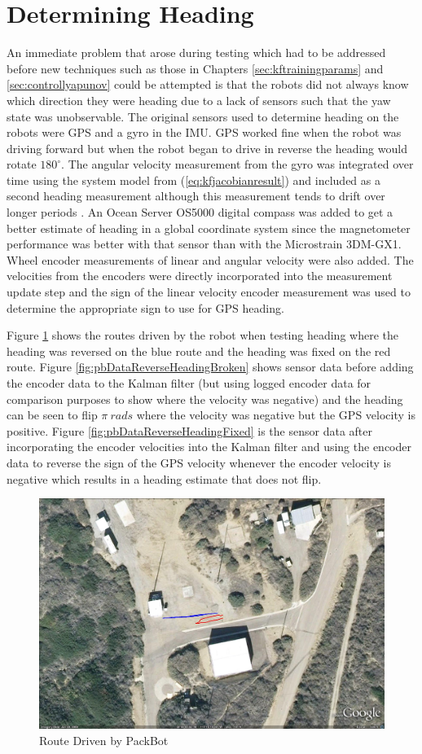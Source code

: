 \section{Determining Heading}
\label{sec:determineHeading}
An immediate problem that arose during testing which had to be addressed before new techniques such as those in Chapters \ref{sec:kftrainingparams} and \ref{sec:controllyapunov} could be attempted is that the robots did not always know which direction they were heading due to a lack of sensors such that the yaw state was unobservable. The original sensors used to determine heading on the robots were GPS and a gyro in the IMU. GPS worked fine when the robot was driving forward but when the robot began to drive in reverse the heading would rotate $180^\circ$. The angular velocity measurement from the gyro was integrated over time using the system model from (\ref{eq:kfjacobianresult}) and included as a second heading measurement although this measurement tends to drift over longer periods \cite{ChungOjeda01}. An Ocean Server OS5000 digital compass was added to get a better estimate of heading in a global coordinate system since the magnetometer performance was better with that sensor than with the Microstrain 3DM-GX1. Wheel encoder measurements of linear and angular velocity were also added. The velocities from the encoders were directly incorporated into the measurement update step and the sign of the linear velocity encoder measurement was used to determine the appropriate sign to use for GPS heading.

Figure \ref{fig:GEHeadingReverse} shows the routes driven by the robot when testing heading where the heading was reversed on the blue route and the heading was fixed on the red route. Figure \ref{fig:pbDataReverseHeadingBroken} shows sensor data before adding the encoder data to the Kalman filter (but using logged encoder data for comparison purposes to show where the velocity was negative) and the heading can be seen to flip $\pi ~ rads$ where the velocity was negative but the GPS velocity is positive. Figure \ref{fig:pbDataReverseHeadingFixed} is the sensor data after incorporating the encoder velocities into the Kalman filter and using the encoder data to reverse the sign of the GPS velocity whenever the encoder velocity is negative which results in a heading estimate that does not flip.

\begin{figure}[ht!]
	\centering
	\includegraphics[width=.7\textwidth]{images/GE/GEHeadingReverseFixed}
	\caption{Route Driven by PackBot}
	\label{fig:GEHeadingReverse}
\end{figure}

